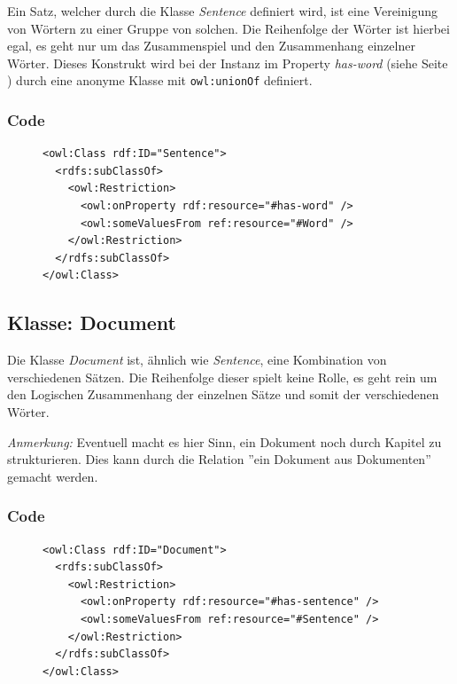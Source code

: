 \documentclass[
    11pt,
    latin1,
    a4paper,
    oneside
]{scrreprt}
\begin{document}
Ein Satz, welcher durch die Klasse \emph{Sentence} definiert wird, ist eine Vereinigung von W\"ortern zu einer Gruppe von solchen. Die Reihenfolge der W\"orter ist hierbei egal, es geht nur um das Zusammenspiel und den Zusammenhang einzelner W\"orter. Dieses Konstrukt wird bei der Instanz im Property \emph{has-word} (siehe  Seite \pageref{sec:rel_hasword}) durch eine anonyme Klasse mit \texttt{owl:unionOf} definiert.

\subsubsection{Code}  \label{sec:class_sentence_code}

\begin{figure}[H]
 \lstset{language=XML}
 \begin{lstlisting}[label=owl:sentence,caption={Die Klasse \emph{Sentence} f\"ugt einzelne W\"orter zu einem Satz zusammen}]
<owl:Class rdf:ID="Sentence">
  <rdfs:subClassOf>
    <owl:Restriction>
      <owl:onProperty rdf:resource="#has-word" />
      <owl:someValuesFrom ref:resource="#Word" />
    </owl:Restriction>
  </rdfs:subClassOf>
</owl:Class>
 \end{lstlisting}
\end{figure}

\subsection{Klasse: Document} \label{sec:class_document}

Die Klasse \emph{Document} ist, \"ahnlich wie \emph{Sentence}, eine Kombination von verschiedenen S\"atzen. Die Reihenfolge dieser spielt keine Rolle, es geht rein um den Logischen Zusammenhang der einzelnen S\"atze und somit der verschiedenen W\"orter.

\textit{Anmerkung:} Eventuell macht es hier Sinn, ein Dokument noch durch Kapitel zu strukturieren. Dies kann durch die Relation ''ein Dokument aus Dokumenten'' gemacht werden.

\subsubsection{Code}  \label{sec:class_sentence_code}

\begin{figure}[H]
 \lstset{language=XML}
 \begin{lstlisting}[label=owl:document,caption={Die Klasse \emph{Document} f\"ugt einzelne S\"atze zu einem Dokument zusammen}]
<owl:Class rdf:ID="Document">
  <rdfs:subClassOf>
    <owl:Restriction>
      <owl:onProperty rdf:resource="#has-sentence" />
      <owl:someValuesFrom ref:resource="#Sentence" />
    </owl:Restriction>
  </rdfs:subClassOf>
</owl:Class>
 \end{lstlisting}
\end{figure}
\end{document}
